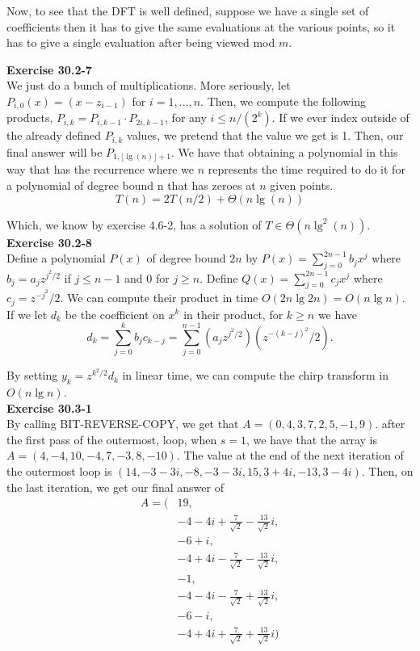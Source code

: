 \documentclass{article}
\begin{document}
Now, to see that the DFT is well defined, suppose we have a single set of coefficients then it has to give the same evaluations at the various points, so it has to give a single evaluation after being viewed mod $m$.

\noindent\textbf{Exercise 30.2-7}\\

We just do a bunch of multiplications. More seriously, let $P_{i,0}(x) = (x-z_{i-1})$ for $i=1,\ldots,n$. Then, we compute the following products, $P_{i,k} = P_{i,k-1} \cdot P_{2i,k-1}$, for any $i\le n/(2^k)$. If we ever index outside of the already defined $P_{i,k}$ values, we pretend that the value we get is 1. Then, our final answer will be $P_{1,\lfloor\lg(n)\rfloor+1}$. We have that obtaining a polynomial in this way that has the recurrence where we $n$ represents the time required to do it for a polynomial of degree bound n that has zeroes at $n$ given points.
\[
T(n) = 2T(n/2) + \Theta(n\lg(n))
\]

Which, we know by exercise 4.6-2, has a solution of $T\in \Theta(n\lg^2(n))$.\\

\noindent\textbf{Exercise 30.2-8}\\

Define a polynomial $P(x)$ of degree bound $2n$ by $P(x) = \sum_{j=0}^{2n-1} b_jx^j$ where $b_j = a_jz^{j^2/2}$ if $j \leq n-1$ and 0 for $j  \geq n$. Define $Q(x) = \sum_{j=0}^{2n-1} c_jx^j$ where $c_j = z^{-j^2}/2$.  We can compute their product in time $O(2n\lg 2n) = O(n \lg n)$. If we let $d_k$ be the coefficient on $x^k$ in their product, for $k \geq n$ we have  
\[d_k = \sum_{j=0}^k b_j c_{k-j} = \sum_{j=0}^{n-1}\left(a_jz^{j^2/2}\right)\left(z^{-(k-j)^2}/2\right).\]

By setting $y_k = z^{k^2/2}d_k$ in linear time, we can compute the chirp transform in $O(n \lg n)$. \\

\noindent\textbf{Exercise 30.3-1}\\

By calling BIT-REVERSE-COPY, we get that $A = (0,4,3,7,2,5,-1,9)$. after the first pass of the outermost, loop, when $s=1$, we have that the array is $A= (4,-4,10,-4,7,-3,8,-10)$. The value at the end of the next iteration of the outermost loop is $(14,-3-3i,-8,-3-3i,15,3+4i,-13,3-4i)$. Then, on the last iteration, we get our final answer of 
\begin{align*}
A = (&19,\\
&-4-4i+\frac{7}{\sqrt{2}} -\frac{13}{\sqrt{2}}i,\\
&-6+i,\\
&-4+4i-\frac{7}{\sqrt{2}} -\frac{13}{\sqrt{2}}i,\\
&-1,\\
&-4-4i-\frac{7}{\sqrt{2}} +\frac{13}{\sqrt{2}}i,\\
&-6-i,\\
&-4+4i+\frac{7}{\sqrt{2}} +\frac{13}{\sqrt{2}}i)
\end{align*}\\
\end{document}

